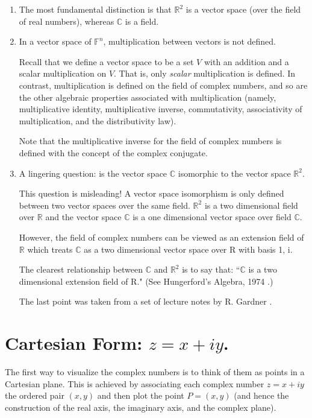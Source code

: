 \documentclass[11pt,reqno,oneside,a4paper]{article}
\begin{document}
\begin{enumerate}
	\item The most fundamental distinction is that $\mathbb{R}^2$ is a vector space (over the field of real numbers), whereas $\mathbb{C}$ is a field. 
	
	\item In a vector space of $\mathbb{F}^n$, multiplication between vectors is not defined. 
	
	Recall that we define a vector space to be a set $V$ with an addition and a scalar
	multiplication on $V$. That is, only \textit{scalar} multiplication is defined. In contrast, multiplication is defined on the field of complex numbers, and so are the other algebraic properties associated with multiplication (namely, multiplicative identity, multiplicative inverse, commutativity, associativity of multiplication, and the distributivity law). 
	
	Note that the multiplicative inverse for the field of complex numbers is defined with the concept of the complex conjugate.  
	
	\item A lingering question: is the vector space $\mathbb{C}$ isomorphic to the vector space $\mathbb{R}^2$.

	This question is misleading! A vector space isomorphism is only defined between two vector spaces over the same field. $\mathbb{R}^2$ is a two dimensional field over $\mathbb{R}$ and the vector space $\mathbb{C}$ is a one dimensional vector space over field $\mathbb{C}$.
	 
	However, the field of complex numbers can be viewed as an extension field of $\mathbb{R}$ which treats $\mathbb{C}$ as a two dimensional vector space over R with basis {1, i}. 
	
	The clearest relationship between $\mathbb{C}$ and $\mathbb{R}^2$ is to say that: ``$\mathbb{C}$ is a two dimensional extension field of R."	(See Hungerford’s Algebra, 1974 \cite{Hun1974a}.)
	
	The last point was taken from a set of lecture notes by R. Gardner \cite{Gar2017a}.
\end{enumerate}

\section{Cartesian Form: $z=x +iy$.}

The first way to visualize the complex numbers is to think of them as points in a Cartesian plane. This is achieved by associating each complex number $z=x +iy$ the ordered pair $(x,y)$ and then plot the point $P=(x,y)$ (and hence the construction of the real axis, the imaginary axis, and the complex plane).
\end{document}
